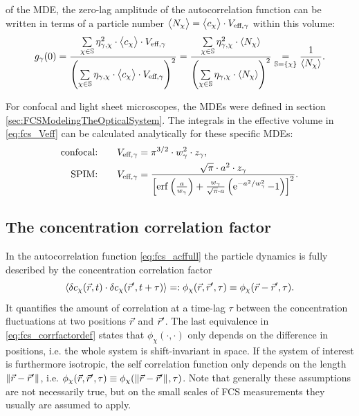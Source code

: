  of the MDE, the zero-lag amplitude of the autocorrelation function can be written in terms of a particle number $\bigl\langle N_\chi\bigr\rangle=\bigl\langle c_\chi\bigr\rangle\cdot V_{{\text{eff}},\gamma}$ within this volume:
\begin{equation}\label{eq:fcs_acf_zerolag}
  g_\gamma(0)=\frac{\sum\limits_{\chi\in\mathbb{S}}\eta_{\gamma,\chi}^2\cdot\bigl\langle c_\chi\bigr\rangle\cdot V_{{\text{eff}},\gamma} }{\left(\sum\limits_{\chi\in\mathbb{S}}\eta_{\gamma,\chi} \cdot\bigl\langle c_\chi\bigr\rangle\cdot V_{{\text{eff}},\gamma}\right)^2} =\frac{\sum\limits_{\chi\in\mathbb{S}}\eta_{\gamma,\chi}^2\cdot\left\langle N_\chi\right\rangle }{\left(\sum\limits_{\chi\in\mathbb{S}}\eta_{\gamma,\chi} \cdot\left\langle N_\chi\right\rangle\right)^2}\underset{\mathbb{S}=\{\chi\}}{=}\frac{1}{\left\langle N_\chi\right\rangle}.
\end{equation}

For confocal and light sheet microscopes, the MDEs were defined in section \ref{sec:FCSModelingTheOpticalSystem}. The integrals in the effective volume in \eqref{eq:fcs_Veff} can be calculated analytically for these specific MDEs:
\begin{align}
   \text{confocal:} \ \ \ \ \ \ V_{{\text{eff}},\gamma}&=\pi^{3/2}\cdot w_\gamma^2\cdot z_\gamma,\label{eq:fcs_Veff_confocal}\\
   \text{SPIM:} \ \ \ \ \ \ V_{{\text{eff}},\gamma}&= \frac{\sqrt{\pi}\cdot a^{2}\cdot z_\gamma}{\left[\operatorname{erf}\left(\frac{a}{w_\gamma}\right)+\frac{w_\gamma}{\sqrt\pi\cdot a}\left(\operatorname{e}^{-a^2/w_{\gamma}^2}-1\right)\right]^2}.\label{eq:fcs_Veff_SPIM}
\end{align}


\subsection{The concentration correlation factor}
\label{sec:TheConcentrationCorrelationFactor}
\noindent In the autocorrelation function \eqref{eq:fcs_acffull} the particle dynamics is fully described by the concentration correlation factor 
\begin{equation}\label{eq:fcs_corrfactordef}
    \left\langle \delta c_\chi(\vec{r},t)\cdot\delta c_\chi(\vec{r}',t+\tau)\right\rangle=:\phi_\chi(\vec{r},\vec{r}',\tau)\equiv \phi_\chi(\vec{r}-\vec{r}',\tau).
\end{equation}
It quantifies the amount of correlation at a time-lag $\tau$ between the concentration fluctuations at two positions $\vec{r}$ and $\vec{r}'$. The last equivalence in \eqref{eq:fcs_corrfactordef} states that $\phi_\chi(\cdot,\cdot)$ only depends on the difference in positions, i.e. the whole system is shift-invariant in space. If the system of interest is furthermore isotropic, the self correlation function only depends on the length $\|\vec{r}-\vec{r}'\|_{}$, i.e. \mbox{$\phi_\chi(\vec{r},\vec{r}',\tau)\equiv \phi_\chi(\|\vec{r}-\vec{r}'\|_{},\tau)$}. Note that generally these assumptions are not necessarily true, but on the small scales of FCS measurements they usually are assumed to apply.

